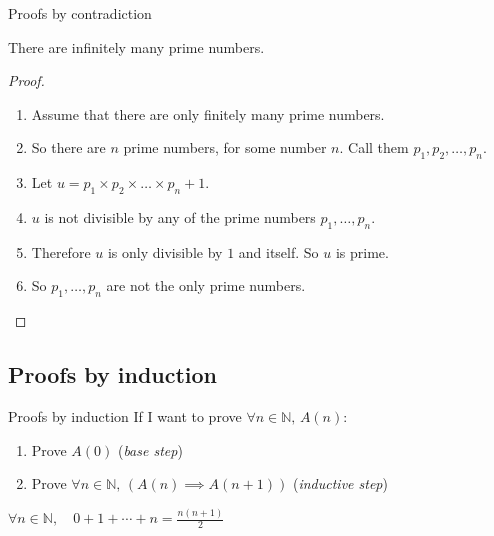 \documentclass[11pt]{beamer}
\theoremstyle{definition}
\begin{document}
\begin{frame}{Proofs by contradiction}
  \begin{theorem}
    There are infinitely many prime numbers.
  \end{theorem}
  \pause
  \begin{proof}
    \begin{enumerate}
    \item Assume that there are only finitely many prime numbers.
    \pause
    \item So there are $n$ prime numbers, for some number $n$.
          Call them $p_1,p_2,\dots,p_n$.
    \pause
    \item Let $u=p_1\times p_2\times \dots \times p_n +1$.
    \pause
    \item $u$ is not divisible by any of the prime numbers $p_1,\dots,p_n$.
    \pause
    \item Therefore $u$ is only divisible by $1$ and itself. So $u$ is prime.
    \pause
    \item So $p_1,\dots,p_n$ are not the only prime numbers.
    \end{enumerate}
  \end{proof}

\end{frame}


\subsection{Proofs by induction}

\begin{frame}{Proofs by induction}
  If I want to prove $\forall n\in \mathbb N,\, A(n)$:
  \begin{enumerate}
    \item Prove $A(0)$ (\emph{base step})
    \item Prove $\forall n\in \mathbb N,\, (A(n)\implies A(n+1))$
    (\emph{inductive step})
  \end{enumerate}
  \pause
  \begin{theorem}
    $\forall n\in \mathbb N,\quad 0+1+\cdots + n=\frac{n(n+1)}{2}$
  \end{theorem}

\end{frame}
\end{document}
